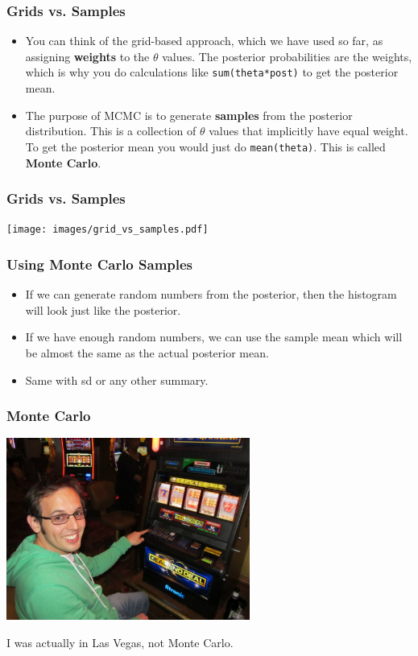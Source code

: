 \documentclass{beamer}
\begin{document}
\begin{frame}[fragile]
\frametitle{Grids vs. Samples}
\begin{itemize}
\item You can think of the grid-based approach, which we have used so far,
as assigning {\bf weights} to the $\theta$ values. The posterior probabilities
are the weights, which is why you do calculations like
\texttt{sum(theta*post)} to get the posterior mean.\pause
\item The purpose of MCMC is to generate {\bf samples} from the posterior
distribution. This is a collection of $\theta$ values that implicitly have
equal weight. To get the posterior mean you would just do \texttt{mean(theta)}.
This is called {\bf Monte Carlo}.
\end{itemize}


\end{frame}


\begin{frame}[fragile]
\frametitle{Grids vs. Samples}
\centering
\texttt{[image: images/grid\_vs\_samples.pdf]}

\end{frame}

\begin{frame}
\frametitle{Using Monte Carlo Samples}
\begin{itemize}
\item If we can generate random numbers from the
posterior, then the histogram will look just like the posterior.\pause
\item If we have enough random numbers, we can use the
sample mean which will be almost the same as the
actual posterior mean.\pause
\item Same with sd or any other summary.
\end{itemize}

\end{frame}

\begin{frame}
\frametitle{Monte Carlo}
\centering
\includegraphics[width=0.6\textwidth]{images/vegas.png}

I was actually in Las Vegas, not Monte Carlo.

\end{frame}
\end{document}
